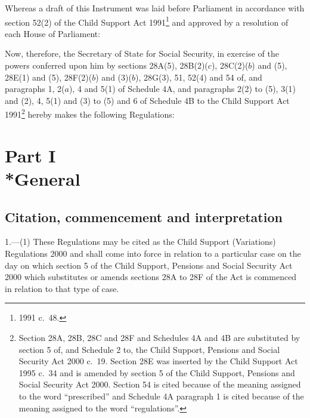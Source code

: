 \documentclass[12pt,a4paper]{article}
\title{\regstitle}
\author{S.I.\ 2001 No.\ 156}
\date{Made
18th January 2001\\
Coming into force
as provided in regulation 1(1)
}
\begin{document}
\maketitle

\noindent
Whereas a draft of this Instrument was laid before Parliament in accordance with section 52(2) of the Child Support Act 1991\footnote{1991 c.\ 48.} and approved by a resolution of each House of Parliament:

Now, therefore, the Secretary of State for Social Security, in exercise of the powers conferred upon him by sections 28A(5), 28B(2)($c$), 28C(2)($b$)  and (5), 28E(1) and (5), 28F(2)($b$)  and (3)($b$), 28G(3), 51, 52(4) and 54 of, and paragraphs 1, 2($a$), 4 and 5(1) of Schedule 4A, and paragraphs 2(2) to (5), 3(1) and (2), 4, 5(1) and (3) to (5) and 6 of Schedule 4B to the Child Support Act 1991\footnote{Section 28A, 28B, 28C and 28F and Schedules 4A and 4B are substituted by section 5 of, and Schedule 2 to, the Child Support, Pensions and Social Security Act 2000 c.\ 19. Section 28E was inserted by the Child Support Act 1995 c.\ 34 and is amended by section 5 of the Child Support, Pensions and Social Security Act 2000. Section 54 is cited because of the meaning assigned to the word “prescribed” and Schedule 4A paragraph 1 is cited because of the meaning assigned to the word “regulations”.} hereby makes the following Regulations: 

{\sloppy

\tableofcontents

}

\bigskip

\setcounter{secnumdepth}{-2}

\section[Part I --- General]{Part I\\*General}

\renewcommand\parthead{--- Part I}

\subsection[1. Citation, commencement and interpretation]{Citation, commencement and interpretation}

1.---(1)  These Regulations may be cited as the Child Support (Variations) Regulations 2000 and shall come into force in relation to a particular case on the day on which section 5 of the Child Support, Pensions and Social Security Act 2000 which substitutes or amends sections 28A to 28F of the Act is commenced in relation to that type of case.
\end{document}
